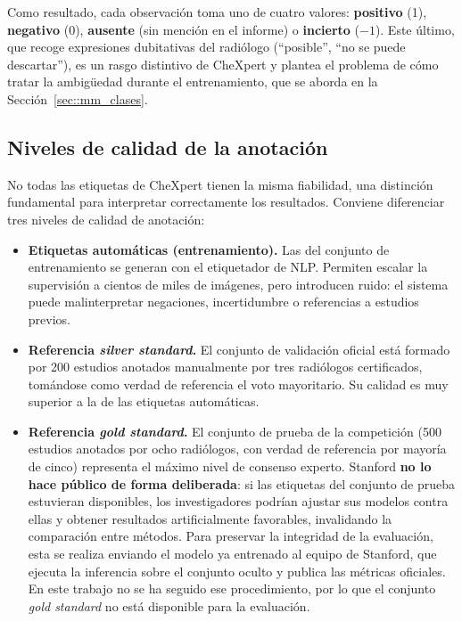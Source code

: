 Como resultado, cada observación toma uno de cuatro valores: \textbf{positivo}
(1), \textbf{negativo} (0), \textbf{ausente} (sin mención en el informe) o
\textbf{incierto} ($-1$). Este último, que recoge expresiones dubitativas del
radiólogo (``posible'', ``no se puede descartar''), es un rasgo distintivo de
CheXpert y plantea el problema de cómo tratar la ambigüedad durante el
entrenamiento, que se aborda en la Sección~\ref{sec::mm_clases}.

\subsection{Niveles de calidad de la anotación}

No todas las etiquetas de CheXpert tienen la misma fiabilidad, una distinción
fundamental para interpretar correctamente los resultados. Conviene diferenciar
tres niveles de calidad de anotación:

\begin{itemize}
  \item \textbf{Etiquetas automáticas (entrenamiento).} Las del conjunto de
        entrenamiento se generan con el etiquetador de NLP. Permiten escalar la
        supervisión a cientos de miles de imágenes, pero introducen ruido: el
        sistema puede malinterpretar negaciones, incertidumbre o referencias a
        estudios previos.
  \item \textbf{Referencia \textit{silver standard}.} El conjunto de validación
        oficial está formado por 200 estudios anotados manualmente por tres
        radiólogos certificados, tomándose como verdad de referencia el voto
        mayoritario. Su calidad es muy superior a la de las etiquetas
        automáticas.
  \item \textbf{Referencia \textit{gold standard}.} El conjunto de prueba de la
        competición (500 estudios anotados por ocho radiólogos, con verdad de
        referencia por mayoría de cinco) representa el máximo nivel de consenso
        experto. Stanford \textbf{no lo hace público de forma deliberada}: si las
        etiquetas del conjunto de prueba estuvieran disponibles, los
        investigadores podrían ajustar sus modelos contra ellas y obtener
        resultados artificialmente favorables, invalidando la comparación entre
        métodos. Para preservar la integridad de la evaluación, esta se realiza
        enviando el modelo ya entrenado al equipo de Stanford, que ejecuta la
        inferencia sobre el conjunto oculto y publica las métricas oficiales. En
        este trabajo no se ha seguido ese procedimiento, por lo que el conjunto
        \textit{gold standard} no está disponible para la evaluación.
\end{itemize}

